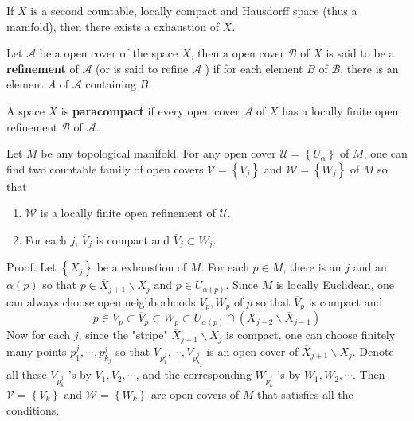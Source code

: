 \documentclass[12pt, oneside]{book}
\begin{document}
\begin{theorem}
    If $X$ is a second countable, locally compact and Hausdorff space (thus a manifold), then there exists a exhaustion of $X$.
\end{theorem}

\begin{definition}
    Let $\mathcal{A}$ be a open cover of the space $X$, then a open cover $\mathcal{B}$ of $X$ is said to be a \textbf{refinement} of $\mathcal{A}$ (or is said to refine $\mathcal{A}$ ) if for each element $B$ of $\mathcal{B}$, there is an element $A$ of $\mathcal{A}$ containing $B$.
\end{definition}
\begin{definition}
    A space $X$ is \textbf{paracompact} if every open cover $\mathcal{A}$ of $X$ has a locally finite open      refinement $\mathcal{B}$ of $\mathcal{A}$.
\end{definition}

\begin{theorem}
    Let $M$ be any topological manifold. For any open cover $\mathcal{U}=\left\{U_\alpha\right\}$ of $M$, one can find two countable family of open covers $\mathcal{V}=\left\{V_j\right\}$ and $\mathcal{W}=\left\{W_j\right\}$ of $M$ so that
    \begin{enumerate}[label=(\roman*)]
        \item $\mathcal{W}$ is a locally finite open refinement of $\mathcal{U}$.
        \item For each $j$, $ \overline{V}_j$ is compact and $\overline{V}_j \subset W_j$.

    \end{enumerate}

    Proof.
    Let $\left\{X_j\right\}$ be a exhaustion of $M$.  For each $p \in M$, there is an $j$ and an $\alpha(p)$ so that $p \in \overline{X}_{j+1} \backslash X_j$ and $p \in U_{\alpha(p)}$.
    Since $M$ is locally Euclidean, one can always choose open neighborhoods $V_p, W_p$ of $p$ so that $\overline{V}_p$ is compact and
    \begin{equation*}
        p
        \in
        V_p
        \subset
        \overline{V}_p
        \subset
        W_p
        \subset
        U_{\alpha(p)} \cap\left(X_{j+2} \backslash \overline{X}_{j-1}\right)
    \end{equation*}
    Now for each $j$, since the "stripe" $\overline{X}_{j+1} \backslash X_j$ is compact, one can choose finitely many points $p_1^j, \cdots, p_{k_j}^j$ so that $V_{p_1^j}, \cdots, V_{p_{k_j}^j}$ is an open cover of $\overline{X}_{j+1} \backslash X_j$.
    Denote all these $V_{p_k^j}$ 's by $V_1, V_2, \cdots$, and the corresponding $W_{p_k^j}$ 's by $W_1, W_2, \cdots$. Then $\mathcal{V}=\left\{V_k\right\}$ and $\mathcal{W}=\left\{W_k\right\}$ are open covers of $M$ that satisfies all the conditions.
\end{theorem}
\end{document}
